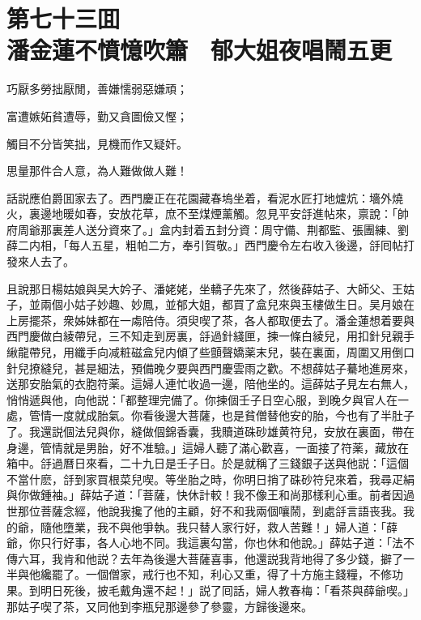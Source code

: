 
\chapter*{第七十三囬　\\潘金蓮不憤憶吹簫　郁大姐夜唱鬧五更}
\thispagestyle{empty}

\begin{myquote}
巧厭多勞拙厭閒，善嫌懦弱惡嫌頑；

富遭嫉妬貧遭辱，勤又貪圖儉又慳；

觸目不分皆笑拙，見機而作又疑奸。

思量那件合人意，為人難做做人難！
\end{myquote}

話説應伯爵囬家去了。西門慶正在花園藏春塢坐着，看泥水匠打地爐炕：墻外燒火，裏邊地暖如春，安放花草，庶不至煤煙薰觸。忽見平安㧱進帖來，禀說：「帥府周爺那裏差人送分資來了。」盒内封着五封分資：周守備、荆都監、張團練、劉薛二内相，「每人五星，粗帕二方，奉引賀敬。」西門慶令左右收入後邊，㧱囘帖打發來人去了。

且說那日楊姑娘與吴大妗子、潘姥姥，坐轎子先來了，然後薛姑子、大師父、王姑子，並兩個小姑子妙趣、妙鳳，並郁大姐，都買了盒兒來與玉樓做生日。吴月娘在上房擺茶，衆姊妹都在一䖏陪侍。須臾喫了茶，各人都取便去了。潘金蓮想着要與西門慶做白綾帶兒，三不知走到房裏，㧱過針綫匣，揀一條白綾兒，用扣針兒親手䋺龍帶兒，用纖手向减粧磁盒兒内傾了些顫聲嬌薬末兒，裝在裏面，周圍又用倒口針兒撩縫兒，甚是細法，預備晚夕要與西門慶雲雨之歡。不想薛姑子驀地進房來，送那安胎氣的衣胞符薬。這婦人連忙收過一邊，陪他坐的。這薛姑子見左右無人，悄悄遞與他，向他説：「都整理完備了。你揀個壬子日空心服，到晚夕與官人在一處，管情一度就成胎氣。你看後邊大菩薩，也是貧僧替他安的胎，今也有了半肚子了。我還説個法兒與你，縫做個錦香囊，我贖道硃砂雄黄符兒，安放在裏面，帶在身邊，管情就是男胎，好不准驗。」這婦人聽了滿心歡喜，一面接了符薬，藏放在箱中。㧱過曆日來看，二十九日是壬子日。於是就稱了三錢銀子送與他説：「這個不當什麽，㧱到家買根菜兒喫。等坐胎之時，你明日捎了硃砂符兒來着，我尋疋絹與你做鍾袖。」薛姑子道：「菩薩，快休計較！我不像王和尚那樣利心重。前者因過世那位菩薩念經，他說我攙了他的主顧，好不和我兩個嚷鬧，到處㧱言語丧我。我的爺，隨他墮業，我不與他爭執。我只替人家行好，救人苦難！」婦人道：「薛爺，你只行好事，各人心地不同。我這裏勾當，你也休和他說。」薛姑子道：「法不傳六耳，我肯和他説？去年為後邊大菩薩喜事，他還説我背地得了多少錢，擗了一半與他纔罷了。一個僧家，戒行也不知，利心又重，得了十方施主錢糧，不修功果。到明日死後，披毛戴角還不起！」説了囘話，婦人教春梅：「看茶與薛爺喫。」那姑子喫了茶，又同他到李瓶兒那邊參了參靈，方歸後邊來。


